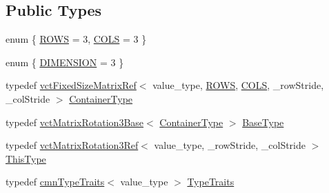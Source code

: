 \subsection*{Public Types}
\begin{DoxyCompactItemize}
\item 
enum \{ \hyperlink{group__cisst_vector_ggad8b09a8996d8d39c1a4e6d1d1143d5d5a11813f4600989202aee03ee7754ab0d1}{R\+O\+W\+S} = 3, 
\hyperlink{group__cisst_vector_ggad8b09a8996d8d39c1a4e6d1d1143d5d5a0fcc4856678937e7ae2094a9d06b05e5}{C\+O\+L\+S} = 3
 \}
\item 
enum \{ \hyperlink{group__cisst_vector_gga0eeec6fc7124d73c9d025d98c3f17b9fab44a8c65e2884fa5d2b3c6a92aa23b2e}{D\+I\+M\+E\+N\+S\+I\+O\+N} = 3
 \}
\item 
typedef \hyperlink{classvct_fixed_size_matrix_ref}{vct\+Fixed\+Size\+Matrix\+Ref}$<$ value\+\_\+type, \hyperlink{group__cisst_vector_ggad8b09a8996d8d39c1a4e6d1d1143d5d5a11813f4600989202aee03ee7754ab0d1}{R\+O\+W\+S}, \hyperlink{group__cisst_vector_ggad8b09a8996d8d39c1a4e6d1d1143d5d5a0fcc4856678937e7ae2094a9d06b05e5}{C\+O\+L\+S}, \+\_\+row\+Stride, \+\_\+col\+Stride $>$ \hyperlink{classvct_matrix_rotation3_ref_acf072a6c67950bf0621787114bb016b4}{Container\+Type}
\item 
typedef \hyperlink{classvct_matrix_rotation3_base}{vct\+Matrix\+Rotation3\+Base}$<$ \hyperlink{classvct_matrix_rotation3_ref_acf072a6c67950bf0621787114bb016b4}{Container\+Type} $>$ \hyperlink{classvct_matrix_rotation3_ref_a6710fec4e5d3c1a4f8f376293b1f30dd}{Base\+Type}
\item 
typedef \hyperlink{classvct_matrix_rotation3_ref}{vct\+Matrix\+Rotation3\+Ref}$<$ value\+\_\+type, \+\_\+row\+Stride, \+\_\+col\+Stride $>$ \hyperlink{classvct_matrix_rotation3_ref_aa4f99a97ebf5b94d4030335f45c91966}{This\+Type}
\item 
typedef \hyperlink{classcmn_type_traits}{cmn\+Type\+Traits}$<$ value\+\_\+type $>$ \hyperlink{classvct_matrix_rotation3_ref_a1627d01cd92c60b2a20b920593015948}{Type\+Traits}
\end{DoxyCompactItemize}
